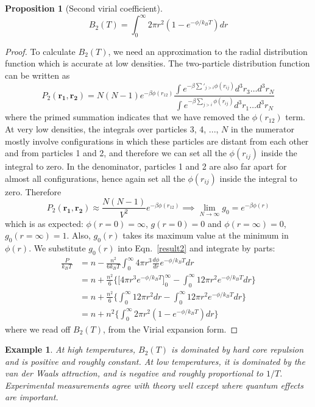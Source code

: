 \documentclass[a4paper]{article}
\newtheorem{eg}{Example}[section]
\theoremstyle{new}
\newtheorem{prop}{Proposition}[section]
\begin{document}
\begin{prop}[Second virial coefficient]
\begin{equation}
B_2(T)=\int_0^\infty2\pi r^2(1-e^{-\phi/k_BT})dr\label{secondcoeff}
\end{equation}
\end{prop}
\begin{proof}
To calculate $B_2(T)$, we need an approximation to the radial distribution function which is accurate at low densities. The two-particle distribution function can be written as
$$P_2(\mathbf{r_1},\mathbf{r_2})=N(N-1)e^{-\beta\phi(r_{12})}\frac{\int e^{-\beta\sum'_{j>i}\phi(r_{ij})}d^3r_3\dots d^3r_N}{\int e^{-\beta\sum_{j>i}\phi(r_{ij})}d^3r_1\dots d^3r_N}$$
where the primed summation indicates that we have removed the $\phi(r_{12})$ term. At very low densities, the integrals over particles 3, 4, ..., $N$ in the numerator mostly involve configurations in which these particles are distant from each other and from particles 1 and 2, and therefore we can set all the $\phi(r_{ij})$ inside the integral to zero. In the denominator, particles 1 and 2 are also far apart for almost all configurations, hence again set all the $\phi(r_{ij})$ inside the integral to zero. Therefore
$$P_2(\mathbf{r_1},\mathbf{r_2})\approx\frac{N(N-1)}{V^2}e^{-\beta\phi(r_{12})}\implies\lim_{N\rightarrow\infty}g_0=e^{-\beta\phi(r)}$$
which is as expected: $\phi(r=0)=\infty$, $g(r=0)=0$ and $\phi(r=\infty)=0$, $g_0(r=\infty)=1$. Also, $g_0(r)$ takes its maximum value at the minimum in $\phi(r)$. We substitute $g_0(r)$ into Eqn.~\ref{result2} and integrate by parts:
\begin{align}
    \frac{P}{k_BT}&=n-\frac{n^2}{6k_BT}\int_0^\infty 4\pi r^3\frac{d\phi}{dr}e^{-\phi/k_BT}dr\nonumber\\&=n+\frac{n^2}{6}\bigg\{\bigg[4\pi r^3e^{-\phi/k_BT}\bigg]_0^\infty-\int_0^\infty 12\pi r^2e^{-\phi/k_BT}dr\bigg\}\nonumber\\&=n+\frac{n^2}{6}\bigg\{\int_0^\infty 12\pi r^2dr-\int_0^\infty 12\pi r^2e^{-\phi/k_BT}dr\bigg\}\nonumber\\&=n+n^2\bigg\{\int_0^\infty 2\pi r^2(1-e^{-\phi/k_BT})dr\bigg\}\nonumber
\end{align}
where we read off $B_2(T)$, from the Virial expansion form.
\end{proof}
\begin{eg}
At high temperatures, $B_2(T)$ is dominated by hard core repulsion and is positive and roughly constant. At low temperatures, it is dominated by the van der Waals attraction, and is negative and roughly proportional to $1/T$. Experimental measurements agree with theory well except where quantum effects are important.
\end{eg}
\end{document}
